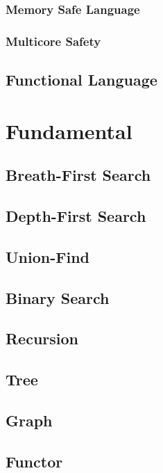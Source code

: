 \documentclass{kdp}
\begin{document}
\section{Memory Safe Language}

\section{Multicore Safety}

\chapter{Functional Language}

\part{Fundamental}

\chapter{Breath-First Search}



\chapter{Depth-First Search}



\chapter{Union-Find}

\chapter{Binary Search}

\chapter{Recursion}

\chapter{Tree}

\chapter{Graph}

\chapter{Functor}
\end{document}
